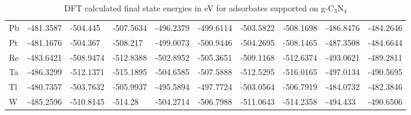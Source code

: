 \begin{table}[h]
{\begin{tabular}{*{10}{l}}
    Pb & -481.3587 & -504.445  & -507.5634 & -496.2379 & -499.6114 & -503.5822 & -508.1698 & -486.8476 & -484.2646 \\
    Pt & -481.1676 & -504.367  & -508.217  & -499.0073 & -500.9446 & -504.2695 & -508.1465 & -487.3508 & -484.6644 \\
    Re & -483.6421 & -508.9474 & -512.8388 & -502.8952 & -505.3651 & -509.1168 & -512.6374 & -493.0621 & -489.2811 \\
    Ta & -486.3299 & -512.1371 & -515.1895 & -504.6585 & -507.5888 & -512.5295 & -516.0165 & -497.0134 & -490.5695 \\
    Tl & -480.7357 & -503.7632 & -505.9937 & -495.5894 & -497.7724 & -503.0564 & -506.7919 & -484.0732 & -482.3846 \\
    W  & -485.2596 & -510.8145 & -514.28   & -504.2714 & -506.7988 & -511.0643 & -514.2358 & -494.433  & -490.6506 \\
    \hline
  \end{tabular}
  }
  \caption{DFT calculated final state energies in eV for adsorbates supported on g-C$_3$N$_4$}
  \label{si_table4}
\end{table}


